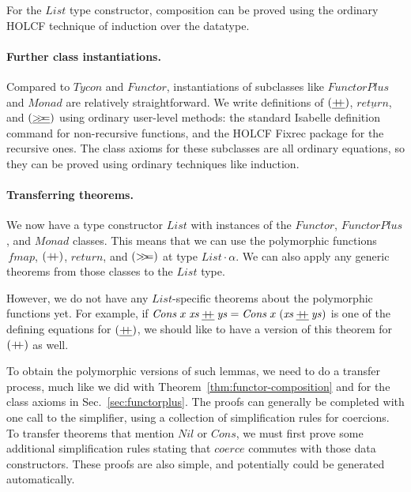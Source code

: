 \documentclass{sigplanconf}
\newcommand{\hsapp}{\mathbin{+\mkern-7mu+}}
\newcommand{\hsbind}{\mathbin{>\mkern-6mu>\mkern-6.5mu=}}
\newcommand{\univ}[1]{\ensuremath{\underline{#1}}}
\newcommand{\hsc}[1]{\ensuremath{\mathit{#1}}}
\newcommand{\fmap}{\,\hsc{fmap}} %
\newcommand{\hsbindU}{\mathbin{\univ{\hsbind}}}
\newcommand{\hsappU}{\mathbin{\univ{\hsapp}}}
\newcommand{\tA}{\alpha}
\theoremstyle{definition}
\begin{document}
For the \hsc{List} type constructor, composition can be proved using the ordinary HOLCF technique of induction over the datatype.

\paragraph{Further class instantiations.}

Compared to \hsc{Tycon} and \hsc{Functor}, instantiations of subclasses like \hsc{FunctorPlus} and \hsc{Monad} are relatively straightforward. We write definitions of $(\hsappU)$, $\univ{\hsc{return}}$, and $(\hsbindU)$ using ordinary user-level methods: the standard Isabelle definition command for non-recursive functions, and the HOLCF Fixrec package \cite{holcf11} for the recursive ones. The class axioms for these subclasses are all ordinary equations, so they can be proved using ordinary techniques like induction.

\paragraph{Transferring theorems.}

We now have a type constructor \hsc{List} with instances of the \hsc{Functor}, \hsc{FunctorPlus}, and \hsc{Monad} classes. This means that we can use the polymorphic functions $\fmap$, $(\hsapp)$, \hsc{return}, and $(\hsbind)$ at type $\hsc{List}\cdot\tA$. We can also apply any generic theorems from those classes to the \hsc{List} type.

However, we do not have any \hsc{List}-specific theorems about the polymorphic functions yet. For example, if $\hsc{Cons}\;x\;\hsc{xs} \hsappU \hsc{ys} = \hsc{Cons}\;x\;(\hsc{xs} \hsappU \hsc{ys})$ is one of the defining equations for $(\hsappU)$, we should like to have a version of this theorem for $(\hsapp)$ as well.

To obtain the polymorphic versions of such lemmas, we need to do a transfer process, much like we did with Theorem~\ref{thm:functor-composition} and for the class axioms in Sec.~\ref{sec:functorplus}. The proofs can generally be completed with one call to the simplifier, using a collection of simplification rules for coercions. To transfer theorems that mention \hsc{Nil} or \hsc{Cons}, we must first prove some additional simplification rules stating that \hsc{coerce} commutes with those data constructors. These proofs are also simple, and potentially could be generated automatically.


\end{document}
